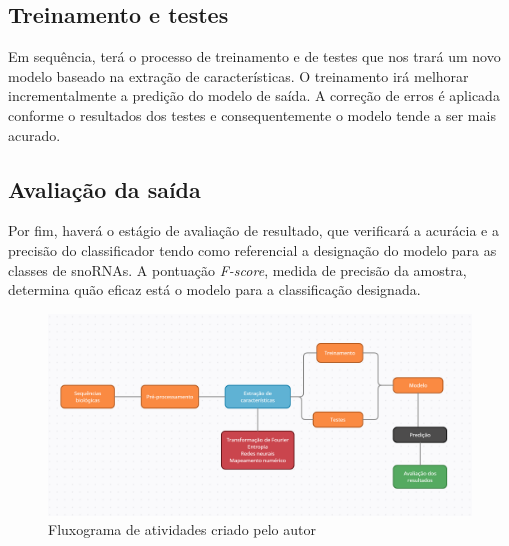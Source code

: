 \subsection{Treinamento e testes}

Em sequência, terá o processo de treinamento e de testes que nos trará um novo modelo baseado na extração de características. O treinamento irá melhorar incrementalmente a predição do modelo de saída. A correção de erros é aplicada conforme o resultados dos testes e consequentemente o modelo tende a ser mais acurado. \cite{training-test}  

\subsection{Avaliação da saída}

Por fim, haverá o estágio de avaliação de resultado, que verificará a acurácia e a precisão do classificador tendo como referencial a designação do modelo para as classes de snoRNAs. A pontuação \textit{F-score}, medida de precisão da amostra, determina quão eficaz está o modelo para a classificação designada.

\begin{figure}[h]
    \centering
    \includegraphics[width=1\textwidth]{images/fluxograma.png}
    \caption{Fluxograma de atividades criado pelo autor}
    \label{fig:workflow}
\end{figure}